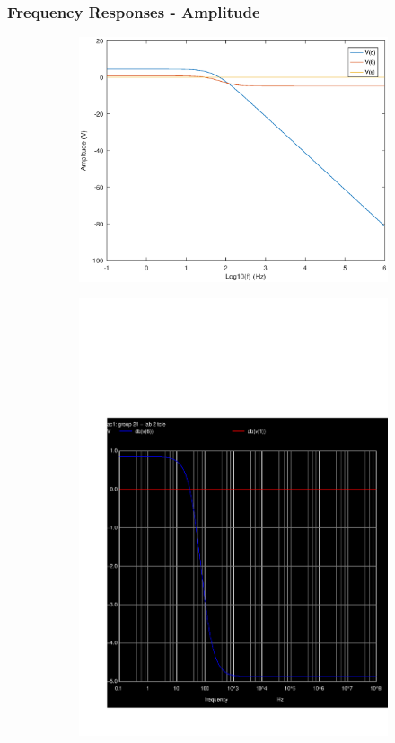\subsubsection{Frequency Responses - Amplitude}

\begin{figure}[h!]
\centering
\begin{subfigure}{.5\textwidth}
  \centering
  \includegraphics[width=.9\linewidth]{amplitude.eps}
  \label{fig:test1}
\end{subfigure}%
\begin{subfigure}{.5\textwidth}
  \centering
  \includegraphics[width=.9\linewidth]{question5_db.pdf}
  \label{fig:test2}
\end{subfigure}
\end{figure}


